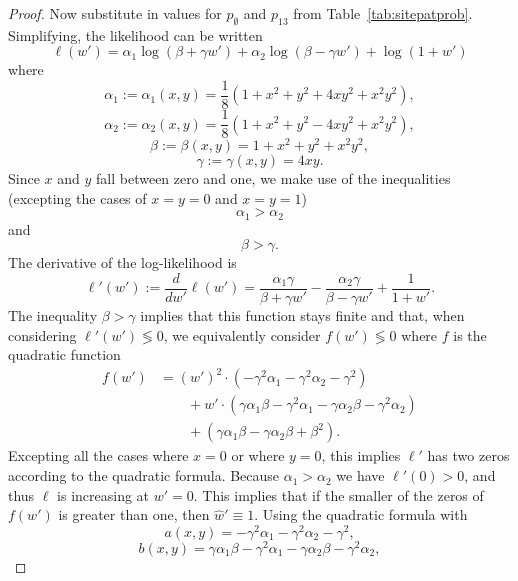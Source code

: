 \begin{proof}
Now substitute in values for $p_{\emptyset}$ and $p_{13}$ from Table~\ref{tab:sitepatprob}.
Simplifying, the likelihood can be written
$$
\ell(w') = \alpha_1\log(\beta+\gamma w') + \alpha_2\log(\beta-\gamma w') + \log(1+w')
$$
where
$$
\alpha_1 := \alpha_1(x, y) = \frac{1}{8} (1+x^2+y^2+4xy^2+x^2y^2),
$$
$$
\alpha_2 := \alpha_2(x, y) = \frac{1}{8}(1+x^2+y^2-4xy^2+x^2y^2),
$$
$$
\beta := \beta(x, y) = 1+x^2+y^2+x^2y^2,
$$
$$
\gamma := \gamma(x, y) = 4xy.
$$
Since $x$ and $y$ fall between zero and one, we make use of the inequalities (excepting the cases of $x=y=0$ and $x=y=1$)
$$
\alpha_1 > \alpha_2
$$
and
$$
\beta > \gamma.
$$
The derivative of the log-likelihood is
$$
\ell'(w') := \frac{d}{dw'} \ell(w') = \frac{\alpha_1 \gamma}{\beta+\gamma w'} - \frac{\alpha_2 \gamma}{\beta-\gamma w'} + \frac{1}{1+w'}.
$$
The inequality $\beta > \gamma$ implies that this function stays finite and that, when considering $\ell'(w') \lessgtr 0$, we equivalently consider $f(w') \lessgtr 0$ where $f$ is the quadratic function
\begin{align*}
f(w') &= (w')^2\cdot(-\gamma^2\alpha_1-\gamma^2\alpha_2-\gamma^2) \\
      &\qquad + w'\cdot(\gamma\alpha_1\beta-\gamma^2\alpha_1-\gamma\alpha_2\beta-\gamma^2\alpha_2) \\
      &\qquad + (\gamma\alpha_1\beta-\gamma\alpha_2\beta+\beta^2).
\end{align*}
Excepting all the cases where $x=0$ or where $y=0$, this implies $\ell'$ has two zeros according to the quadratic formula.
Because $\alpha_1 > \alpha_2$ we have $\ell'(0) > 0$, and thus $\ell$ is increasing at $w'=0$.
This implies that if the smaller of the zeros of $f(w')$ is greater than one, then $\hat{w}' \equiv 1$.
Using the quadratic formula with
$$
a(x, y) = -\gamma^2 \alpha_1 - \gamma^2 \alpha_2 - \gamma^2,
$$
$$
b(x, y) = \gamma \alpha_1 \beta - \gamma^2\alpha_1 - \gamma \alpha_2 \beta - \gamma^2 \alpha_2,
$$
$$
$$
\end{proof}
